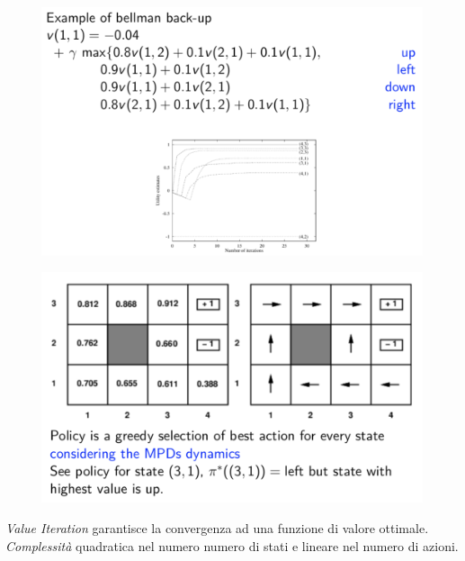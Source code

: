 \documentclass[a4paper, notitlepage, 9pt]{extreport}
\begin{document}
\begin{multicols}{2}
		\begin{figure}[H]
		\centering
		\includegraphics[scale=0.30]{VI1}
	\end{figure}
	\columnbreak
	\begin{figure}[H]
		\centering
		\includegraphics[scale=0.32]{VI2}
	\end{figure}
\end{multicols}
\noindent
\textit{Value Iteration} garantisce la convergenza ad una funzione di valore ottimale. \textit{Complessità} quadratica nel numero numero di stati e lineare nel numero di azioni.
\end{document}

